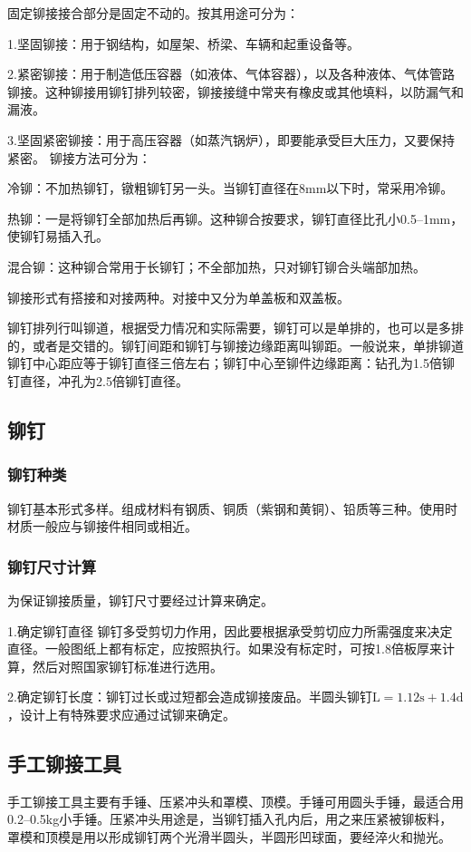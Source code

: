 \documentclass{ctexbook}
\begin{document}
固定铆接接合部分是固定不动的。按其用途可分为：

1.坚固铆接：用于钢结构，如屋架、桥梁、车辆和起重设备等。

2.紧密铆接：用于制造低压容器（如液体、气体容器），以及各种液体、气体管路铆接。这种铆接用铆钉排列较密，铆接接缝中常夹有橡皮或其他填料，以防漏气和漏液。

3.坚固紧密铆接：用于高压容器（如蒸汽锅炉），即要能承受巨大压力，又要保持紧密。
铆接方法可分为：

冷铆：不加热铆钉，镦粗铆钉另一头。当铆钉直径在8mm以下时，常采用冷铆。

热铆：一是将铆钉全部加热后再铆。这种铆合按要求，铆钉直径比孔小0.5--1mm，使铆钉易插入孔。

混合铆：这种铆合常用于长铆钉；不全部加热，只对铆钉铆合头端部加热。

铆接形式有搭接和对接两种。对接中又分为单盖板和双盖板。

铆钉排列行叫铆道，根据受力情况和实际需要，铆钉可以是单排的，也可以是多排的，或者是交错的。铆钉间距和铆钉与铆接边缘距离叫铆距。一般说来，单排铆道铆钉中心距应等于铆钉直径三倍左右；铆钉中心至铆件边缘距离：钻孔为1.5倍铆钉直径，冲孔为2.5倍铆钉直径。
\subsection{铆钉}
\subsubsection{铆钉种类}
铆钉基本形式多样。组成材料有钢质、铜质（紫钢和黄铜）、铅质等三种。使用时材质一般应与铆接件相同或相近。
\subsubsection{铆钉尺寸计算}
为保证铆接质量，铆钉尺寸要经过计算来确定。

1.确定铆钉直径 铆钉多受剪切力作用，因此要根据承受剪切应力所需强度来决定直径。一般图纸上都有标定，应按照执行。如果没有标定时，可按1.8倍板厚来计算，然后对照国家铆钉标准进行选用。

2.确定铆钉长度：铆钉过长或过短都会造成铆接废品。半圆头铆钉$\text{L}=1.12\text{s}+1.4\text{d}$，设计上有特殊要求应通过试铆来确定。
\subsection{手工铆接工具}
手工铆接工具主要有手锤、压紧冲头和罩模、顶模。手锤可用圆头手锤，最适合用0.2--0.5kg小手锤。压紧冲头用途是，当铆钉插入孔内后，用之来压紧被铆板料，罩模和顶模是用以形成铆钉两个光滑半圆头，半圆形凹球面，要经淬火和抛光。
\end{document}
